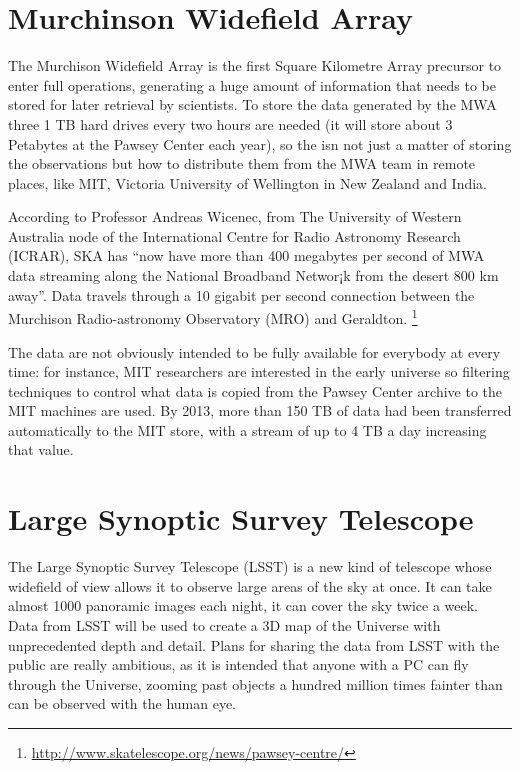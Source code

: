 \section{Murchinson Widefield Array}


The Murchison Widefield Array is the first Square Kilometre Array precursor to enter full operations, generating a huge amount of information that needs to be stored for later retrieval by scientists. To store the data generated by the MWA three 1 TB hard drives every two hours are needed (it will store about 3 Petabytes at the Pawsey Center each year), so the isn not just a matter of storing the observations but how to distribute them from the MWA team in remote places, like MIT, Victoria University of Wellington in New Zealand and India. \newline

According to Professor Andreas Wicenec, from The University of Western Australia node of the International Centre for Radio Astronomy Research (ICRAR), SKA has ``now have more than 400 megabytes per second of MWA data streaming along the National Broadband Networ¡k from the desert 800 km away''. Data travels through a 10 gigabit per second connection between the Murchison Radio-astronomy Observatory (MRO) and Geraldton. \footnote{\url{http://www.skatelescope.org/news/pawsey-centre/}}

The data are not obviously intended to be fully available for everybody at every time: for instance, MIT researchers are interested in the early universe so filtering techniques to control what data is copied from the Pawsey Center archive to the MIT machines are used. By 2013, more than 150 TB of data had been transferred automatically to the MIT store, with a stream of up to 4 TB a day increasing that value. \newline




\section{Large Synoptic Survey Telescope}

The Large Synoptic Survey Telescope (LSST) is a new kind of telescope whose widefield of view allows it to observe large areas of the sky at once. It can take almost 1000 panoramic images each night, it can cover the sky twice a week. Data from LSST will be used to create a 3D map of the Universe with unprecedented depth and detail. Plans for sharing the data from LSST with the public are really ambitious, as it is intended that anyone with a PC can fly through the Universe, zooming past objects a hundred million times fainter than can be observed with the human eye. \newline

